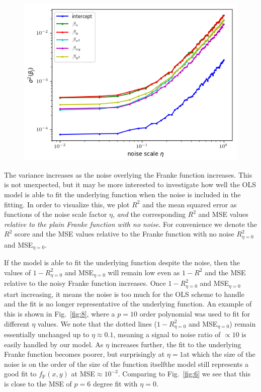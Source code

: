 \documentclass[a4paper, twocolumn]{article}
\newcommand{\fig}[1]{Fig.\ \ref{fig:#1}}
\begin{document}
\begin{figure}
\centering
\includegraphics[width=\linewidth]{beta_variance_OLS_noise.png}
\end{figure}

The variance increases as the noise overlying the Franke function increases. This is not unexpected, but it may be more interested to investigate how well the OLS model is able to fit the underlying function when the noise is included in the fitting. In order to visualize this, we plot $R^2$ and the mean squared error as functions of the noise scale factor $\eta$, \textit{and} the corresponding $R^2$ and MSE values \textit{relative to the plain Franke function with no noise}. For convenience we denote the $R^2$ score and the MSE values relative to the Franke function with no noise $R^2_{\eta=0}$ and MSE$_{\eta=0}$.

If the model is able to fit the underlying function despite the noise, then the values of $1-R^2_{\eta=0}$ and MSE${}_{\eta=0}$ will remain low even as $1-R^2$ and the MSE relative to the noisy Franke function increases. Once $1-R^2_{\eta=0}$ and MSE${}_{\eta=0}$ start increasing, it means the noise is too much for the OLS scheme to handle and the fit is no longer representative of the underlying function. An example of this is shown in \fig{8}, where a $p=10$ order polynomial was used to fit for different $\eta$ values. We note that the dotted lines ($1-R^2_{\eta=0}$ and MSE${}_{\eta=0}$) remain essentially unchanged up to $\eta\approx 0.1$, meaning a signal to noise ratio of $\propto10$ is easily handled by our model. As $\eta$ increases further, the fit to the underlying Franke function becomes poorer, but surprisingly at $\eta=1$\textemdash at which the size of the noise is on the order of the size of the function itself\textemdash the model still represents a good fit to $f_\text{F}(x,y)$ at MSE$\approx10^{-3}$. Comparing to \fig{6} we see that this is close to the MSE of $p=6$ degree fit with $\eta=0$.
\end{document}
